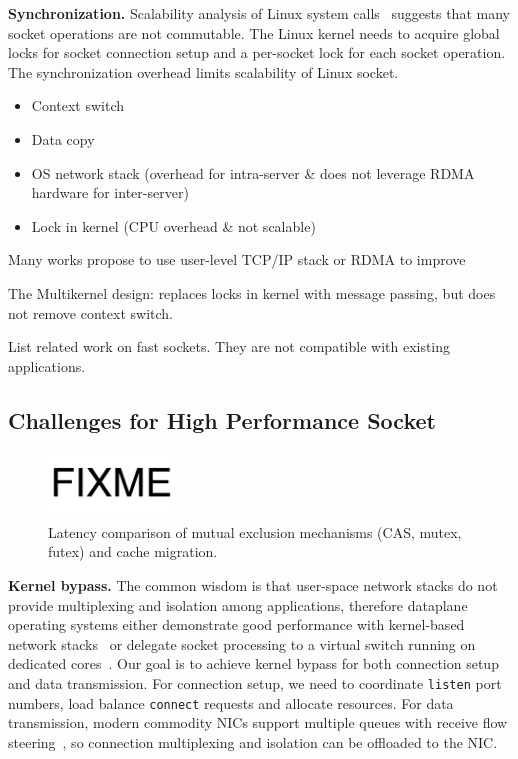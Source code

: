 \textbf{Synchronization.}
Scalability analysis of Linux system calls~\cite{boyd2010analysis} suggests that many socket operations are not commutable. The Linux kernel needs to acquire global locks for socket connection setup and a per-socket lock for each socket operation. The synchronization overhead limits scalability of Linux socket.

\begin{itemize}
	\item Context switch
	\item Data copy
	\item OS network stack (overhead for intra-server \& does not leverage RDMA hardware for inter-server)
	\item Lock in kernel (CPU overhead \& not scalable)
\end{itemize}

Many works propose to use user-level TCP/IP stack  or RDMA  to improve




The Multikernel design: replaces locks in kernel with message passing, but does not remove context switch.

List related work on fast sockets. They are not compatible with existing applications.

\subsection{Challenges for High Performance Socket}
\label{subsec:challenges}

\begin{figure}[t]
	\centering
	\includegraphics[width=0.3\textwidth]{images/fixme}
	\caption{Latency comparison of mutual exclusion mechanisms (CAS, mutex, futex) and cache migration.}
	\label{fig:mutual-exclusion}
\end{figure}

\textbf{Kernel bypass.}
The common wisdom is that user-space network stacks do not provide multiplexing and isolation among applications, therefore dataplane operating systems either demonstrate good performance with kernel-based network stacks~\cite{belay2014ix,tsai2017lite} or delegate socket processing to a virtual switch running on dedicated cores~\cite{martins2014clickos,roghanchi2017ffwd}.
Our goal is to achieve kernel bypass for both connection setup and data transmission.
For connection setup, we need to coordinate \texttt{listen} port numbers, load balance \texttt{connect} requests and allocate resources.
For data transmission, modern commodity NICs support multiple queues with receive flow steering~\cite{herbertrfs,libvma,openonload}, so connection multiplexing and isolation can be offloaded to the NIC.

